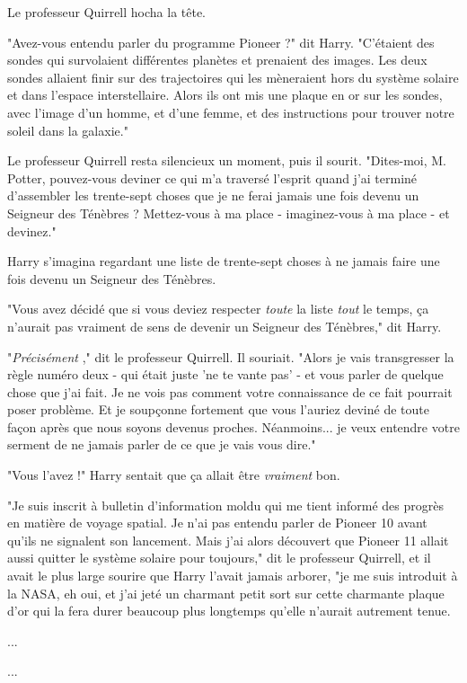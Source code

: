 Le professeur Quirrell hocha la tête.

"Avez-vous entendu parler du programme Pioneer ?" dit Harry. "C'étaient des sondes qui survolaient différentes planètes et prenaient des images. Les deux sondes allaient finir sur des trajectoires qui les mèneraient hors du système solaire et dans l'espace interstellaire. Alors ils ont mis une plaque en or sur les sondes, avec l'image d'un homme, et d'une femme, et des instructions pour trouver notre soleil dans la galaxie."

Le professeur Quirrell resta silencieux un moment, puis il sourit. "Dites-moi, M. Potter, pouvez-vous deviner ce qui m'a traversé l'esprit quand j'ai terminé d'assembler les trente-sept choses que je ne ferai jamais une fois devenu un Seigneur des Ténèbres ? Mettez-vous à ma place - imaginez-vous à ma place - et devinez."

Harry s'imagina regardant une liste de trente-sept choses à ne jamais faire une fois devenu un Seigneur des Ténèbres.

"Vous avez décidé que si vous deviez respecter \emph{toute}  la liste \emph{tout}  le temps, ça n'aurait pas vraiment de sens de devenir un Seigneur des Ténèbres," dit Harry.

"\emph{Précisément} ," dit le professeur Quirrell. Il souriait. "Alors je vais transgresser la règle numéro deux - qui était juste 'ne te vante pas' - et vous parler de quelque chose que j'ai fait. Je ne vois pas comment votre connaissance de ce fait pourrait poser problème. Et je soupçonne fortement que vous l'auriez deviné de toute façon après que nous soyons devenus proches. Néanmoins... je veux entendre votre serment de ne jamais parler de ce que je vais vous dire."

"Vous l'avez !" Harry sentait que ça allait être \emph{vraiment}  bon.

"Je suis inscrit à bulletin d'information moldu qui me tient informé des progrès en matière de voyage spatial. Je n'ai pas entendu parler de Pioneer 10 avant qu'ils ne signalent son lancement. Mais j'ai alors découvert que Pioneer 11 allait aussi quitter le système solaire pour toujours," dit le professeur Quirrell, et il avait le plus large sourire que Harry l'avait jamais arborer, "je me suis introduit à la NASA, eh oui, et j'ai jeté un charmant petit sort sur cette charmante plaque d'or qui la fera durer beaucoup plus longtemps qu'elle n'aurait autrement tenue.

...

...

